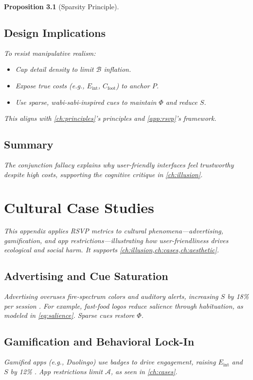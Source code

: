 \documentclass[openany]{book}
\newtheorem{proposition}{Proposition}[chapter]
\newcommand{\PhiS}{\Phi} %
\newcommand{\Sent}{S} %
\newcommand{\Eint}{E_{\mathrm{int}}} %
\newcommand{\Cfoot}{C_{\mathrm{foot}}} %
\newcommand{\Auton}{\mathcal{A}} %
\begin{document}
\begin{proposition}[Sparsity Principle]
\section{Design Implications}
\label{sec:conj-implications}
To resist manipulative realism:
\begin{itemize}
  \item Cap detail density to limit $\mathcal{B}$ inflation.
  \item Expose true costs (e.g., $\Eint$, $\Cfoot$) to anchor $P$.
  \item Use sparse, wabi-sabi-inspired cues to maintain $\PhiS$ and reduce $\Sent$.
\end{itemize}
This aligns with \cref{ch:principles}’s principles and \cref{app:rsvp}’s framework.

\section{Summary}
The conjunction fallacy explains why user-friendly interfaces feel trustworthy despite high costs, supporting the cognitive critique in \cref{ch:illusion}.

\chapter{Cultural Case Studies}
\label{app:cultural}

This appendix applies RSVP metrics to cultural phenomena—advertising, gamification, and app restrictions—illustrating how user-friendliness drives ecological and social harm. It supports \cref{ch:illusion,ch:cases,ch:aesthetic}.

\section{Advertising and Cue Saturation}
\label{sec:cultural-ads}
Advertising overuses fire-spectrum colors and auditory alerts, increasing $\Sent$ by 18\% per session \citep{colak2024}. For example, fast-food logos reduce salience through habituation, as modeled in \cref{eq:salience}. Sparse cues restore $\PhiS$.

\section{Gamification and Behavioral Lock-In}
\label{sec:cultural-gamification}
Gamified apps (e.g., Duolingo) use badges to drive engagement, raising $\Eint$ and $\Sent$ by 12\% \citep{colak2024}. App restrictions limit $\Auton$, as seen in \cref{ch:cases}.


\end{proposition}
\end{document}
